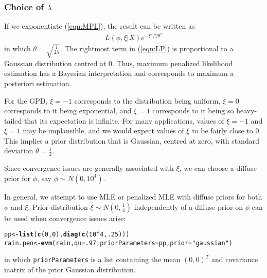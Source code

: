 \documentclass[10pt]{article}\usepackage[]{graphicx}\usepackage[]{color}
\makeatletter
\newcommand{\hlnum}[1]{\textcolor[rgb]{0.686,0.059,0.569}{#1}}%
\newcommand{\hlstr}[1]{\textcolor[rgb]{0.192,0.494,0.8}{#1}}%
\newcommand{\hlopt}[1]{\textcolor[rgb]{0,0,0}{#1}}%
\newcommand{\hlstd}[1]{\textcolor[rgb]{0.345,0.345,0.345}{#1}}%
\newcommand{\hlkwb}[1]{\textcolor[rgb]{0.69,0.353,0.396}{#1}}%
\newcommand{\hlkwc}[1]{\textcolor[rgb]{0.333,0.667,0.333}{#1}}%
\newcommand{\hlkwd}[1]{\textcolor[rgb]{0.737,0.353,0.396}{\textbf{#1}}}%
\newenvironment{kframe}{%
 \def\at@end@of@kframe{}%
 \ifinner\ifhmode%
  \def\at@end@of@kframe{\end{minipage}}%
  \begin{minipage}{\columnwidth}%
 \fi\fi%
 \def\FrameCommand##1{\hskip\@totalleftmargin \hskip-\fboxsep
 \colorbox{shadecolor}{##1}\hskip-\fboxsep
     \hskip-\linewidth \hskip-\@totalleftmargin \hskip\columnwidth}%
 \MakeFramed {\advance\hsize-\width
   \@totalleftmargin\z@ \linewidth\hsize
   \@setminipage}}%
 {\par\unskip\endMakeFramed%
 \at@end@of@kframe}
\newenvironment{knitrout}{}{} %
\makeatother
\begin{document}
\subsubsection{Choice of $\lambda$}
If we exponentiate (\ref{eqn:MPL}), the result can be
written as
\begin{eqnarray}
L(\phi, \xi | X) e^{-\xi^2/2\theta^2} \label{eqn:LP}
\end{eqnarray}
in which $\theta = \sqrt{\frac{1}{2\lambda}}$. The rightmost
term in (\ref{eqn:LP}) is proportional to a Gaussian
distribution centred at 0. Thus, maximum penalized
likelihood estimation has a Bayesian interpretation
and corresponds to maximum a posteriori estimation.

For the GPD, $\xi = -1$ corresponds to the distribution
being uniform, $\xi = 0$ corresponds to it being
exponential, and $\xi = 1$ corresponds to it being so
heavy-tailed that its expectation is infinite. For many applications, values of $\xi = -1$ and $\xi = 1$ may be
implausible, and we would expect values of $\xi$ to be
fairly close to 0. This implies a prior distribution
that is Gaussian, centred at zero, with standard deviation $\theta = \frac{1}{2}$.

Since convergence issues are generally associated with
$\xi$, we can choose a diffuse prior for $\phi$, say
$\phi \sim N(0, 10^4)$.

In general, we attempt to use MLE or penalized MLE with
diffuse priors for both $\phi$ and $\xi$.
Prior distribution $\xi \sim N(0, \frac{1}{4})$
independently of a diffuse prior on $\phi$ can be
used when convergence issues arise:

\begin{knitrout}
\color{fgcolor}\begin{kframe}
\begin{alltt}
\hlstd{pp} \hlkwb{<-} \hlkwd{list}\hlstd{(}\hlkwd{c}\hlstd{(}\hlnum{0}\hlstd{,} \hlnum{0}\hlstd{),} \hlkwd{diag}\hlstd{(}\hlkwd{c}\hlstd{(}\hlnum{10}\hlopt{^}\hlnum{4}\hlstd{,} \hlnum{.25}\hlstd{)))}
\hlstd{rain.pen} \hlkwb{<-} \hlkwd{evm}\hlstd{(rain,} \hlkwc{qu}\hlstd{=}\hlnum{.97}\hlstd{,} \hlkwc{priorParameters} \hlstd{= pp,} \hlkwc{prior}\hlstd{=}\hlstr{"gaussian"}\hlstd{)}
\end{alltt}
\end{kframe}
\end{knitrout}
in which {\tt priorParameters} is a list containing the mean $(0, 0)^T$
and covariance matrix of the prior Gaussian distribution.
%
\end{document}
